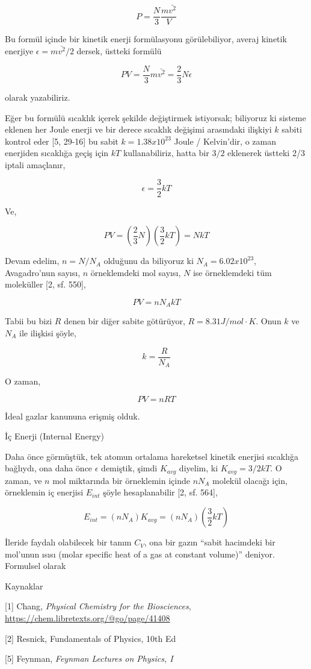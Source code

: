 \documentclass[12pt,fleqn]{article}\usepackage{../../common}
\begin{document}
$$
P = \frac{N}{3} \frac{m \bar{v^2}}{V}
$$

Bu formül içinde bir kinetik enerji formülasyonu görülebiliyor, averaj kinetik
enerjiye $\epsilon = m \bar{v^2} / 2$ dersek, üstteki formülü

$$
PV = \frac{N}{3} m \bar{v^2} = \frac{2}{3} N \epsilon
$$

olarak yazabiliriz.

Eğer bu formülü sıcaklık içerek şekilde değiştirmek istiyorsak; biliyoruz ki
sisteme eklenen her Joule enerji ve bir derece sıcaklık değişimi arasındaki
ilişkiyi $k$ sabiti kontrol eder [5, 29-16] bu sabit $k = 1.38 x 10^{23}$ Joule
/ Kelvin'dir, o zaman enerjiden sıcaklığa geçiş için $kT$ kullanabiliriz, hatta
bir $3/2$ eklenerek üstteki 2/3 iptali amaçlanır,

$$
\epsilon = \frac{3}{2} k T
$$

Ve,

$$
PV = \left( \frac{2}{3} N \right) \left( \frac{3}{2} k T \right) = N k T
$$

Devam edelim, $n = N / N_A$ olduğunu da biliyoruz ki $N_A = 6.02 x 10^{23}$,
Avagadro'nun sayısı, $n$ örneklemdeki mol sayısı, $N$ ise örneklemdeki tüm
moleküller [2, sf. 550],

$$
PV = n N_A k T
$$

Tabii bu bizi $R$ denen bir diğer sabite götürüyor, $R = 8.31 J/mol \cdot
K$. Onun $k$ ve $N_A$ ile ilişkisi şöyle,

$$
k = \frac{R}{N_A}
$$

O zaman,

$$
PV = n R T
$$

İdeal gazlar kanununa erişmiş olduk.

İç Enerji (Internal Energy)

Daha önce görmüştük, tek atomun ortalama hareketsel kinetik enerjisi
sıcaklığa bağlıydı, ona daha önce $\epsilon$ demiştik, şimdi $K_{avg}$
diyelim, ki $K_{avg} = 3/2 k T$. O zaman, ve $n$ mol miktarında bir
örneklemin içinde $n N_A$ molekül olacağı için, örneklemin iç
enerjisi $E_{int}$ şöyle hesaplanabilir [2, sf. 564],

$$
E_{int} = (n N_A) K_{avg} = (n N_A) (\frac{3}{2} k T)
$$

İleride faydalı olabilecek bir tanım $C_V$, ona bir gazın ``sabit hacimdeki bir
mol'unun ısısı (molar specific heat of a gas at constant volume)'' deniyor.
Formulsel olarak




Kaynaklar

[1] Chang, {\em Physical Chemistry for the Biosciences},
    \url{https://chem.libretexts.org/@go/page/41408}

[2] Resnick, Fundamentals of Physics, 10th Ed

[5] Feynman, {\em Feynman Lectures on Physics, I}
\end{document}
